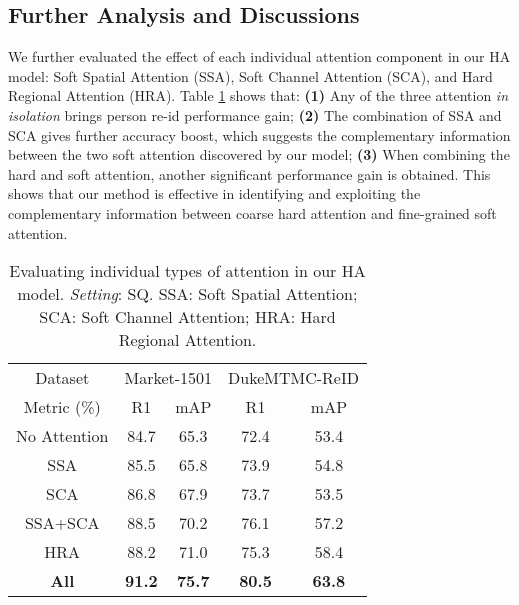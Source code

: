 \documentclass[10pt,twocolumn,letterpaper]{article}
\begin{document}
\subsection{Further Analysis and Discussions} 
\label{sec:fad}

We further evaluated the effect of each individual attention component
in our HA model:
Soft Spatial Attention (SSA), Soft Channel Attention (SCA), and Hard Regional Attention (HRA).
Table \ref{tab:res_am} shows that: 
{\bf (1)} Any of the three attention {\em in isolation} brings person re-id performance gain;
{\bf (2)} The combination of SSA and SCA gives further accuracy boost, which suggests
the complementary information between the two soft attention discovered
by our model;
{\bf (3)} When combining the hard and soft attention, another significant performance gain
is obtained. This shows that our method is effective in identifying
and exploiting the complementary information between 
coarse hard attention and fine-grained
soft attention.

\begin{table} \centering
\renewcommand{\arraystretch}{1}
	\setlength{\tabcolsep}{0.30 cm}
\caption{Evaluating individual types of attention in our HA model.
		{\em Setting}: SQ.
SSA: Soft Spatial Attention;
		SCA: Soft Channel Attention;
		HRA: Hard Regional Attention.
	}
	\vskip -1pt \begin{tabular}{|c|cc|cc|}
		\hline
		Dataset &  \multicolumn{2}{c|}{Market-1501} &
		\multicolumn{2}{c|}{DukeMTMC-ReID} \\ \cline{1-5}
		Metric (\%)    & R1 & mAP & R1 & mAP  \\ \hline \hline
		No Attention &  84.7 &  65.3  &  72.4 &  53.4\\  \hline
SSA & 85.5 & 65.8 & 73.9  & 54.8 \\
SCA & 86.8 & 67.9  &  73.7 &  53.5 \\
		SSA+SCA  &  88.5 &  70.2  &  76.1 &  57.2 \\ \hline
HRA & 88.2 & 71.0 & 75.3 & 58.4
		\\
		\hline
		\bf All & \bf 91.2 & \bf 75.7  & \bf 80.5 & \bf 63.8\\\hline
		
\end{tabular}\label{tab:res_am}
	\vspace{-0.3cm}
\end{table}
\end{document}
